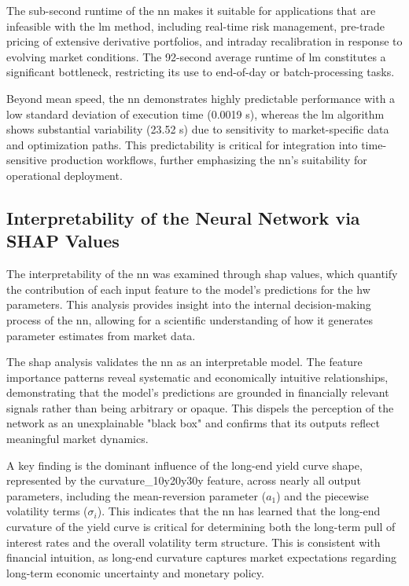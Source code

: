 The sub-second runtime of the \ac{nn} makes it suitable for applications that are infeasible with the \ac{lm} method, including real-time risk management, pre-trade pricing of extensive derivative portfolios, and intraday recalibration in response to evolving market conditions. The 92-second average runtime of \ac{lm} constitutes a significant bottleneck, restricting its use to end-of-day or batch-processing tasks.

Beyond mean speed, the \ac{nn} demonstrates highly predictable performance with a low standard deviation of execution time (0.0019 s), whereas the \ac{lm} algorithm shows substantial variability (23.52 s) due to sensitivity to market-specific data and optimization paths. This predictability is critical for integration into time-sensitive production workflows, further emphasizing the \ac{nn}'s suitability for operational deployment.

\subsection{Interpretability of the Neural Network via SHAP Values}
The interpretability of the \ac{nn} was examined through \ac{shap} values, which quantify the contribution of each input feature to the model's predictions for the \ac{hw} parameters. This analysis provides insight into the internal decision-making process of the \ac{nn}, allowing for a scientific understanding of how it generates parameter estimates from market data.

The \ac{shap} analysis validates the \ac{nn} as an interpretable model. The feature importance patterns reveal systematic and economically intuitive relationships, demonstrating that the model's predictions are grounded in financially relevant signals rather than being arbitrary or opaque. This dispels the perception of the network as an unexplainable "black box" and confirms that its outputs reflect meaningful market dynamics.

A key finding is the dominant influence of the long-end yield curve shape, represented by the curvature\_10y20y30y feature, across nearly all output parameters, including the mean-reversion parameter (\(a_1\)) and the piecewise volatility terms (\(\sigma_i\)). This indicates that the \ac{nn} has learned that the long-end curvature of the yield curve is critical for determining both the long-term pull of interest rates and the overall volatility term structure. This is consistent with financial intuition, as long-end curvature captures market expectations regarding long-term economic uncertainty and monetary policy.


